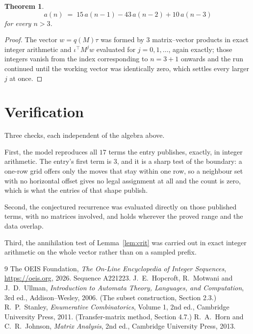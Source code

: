 \documentclass[11pt,a4paper]{article}
\theoremstyle{plain}
\newtheorem{theorem}{Theorem}
\theoremstyle{definition}
\begin{document}
\begin{theorem}
\[
a(n)\;=\;15\,a(n-1) - 43\,a(n-2) + 10\,a(n-3)
\]
for every $n>3$.
\end{theorem}

\begin{proof}
The vector $w=q(M)\tau$ was formed by $3$ matrix--vector products in exact integer
arithmetic and $\iota^{\!\top}M^{j}w$ evaluated for $j=0,1,\dots$, again exactly; those
integers vanish from the index corresponding to $n=3+1$ onwards and the run continued
until the working vector was identically zero, which settles every larger $j$ at once.
\end{proof}

\section{Verification}

Three checks, each independent of the algebra above.

First, the model reproduces all $17$ terms the entry publishes, exactly, in integer
arithmetic. The entry's first term is $3$, and it is a sharp test of the boundary: a
one-row grid offers only the moves that stay within one row, so a neighbour set with no
horizontal offset gives no legal assignment at all and the count is zero, which is what the
entries of that shape publish.

Second, the conjectured recurrence was evaluated directly on those published terms, with no
matrices involved, and holds wherever the proved range and the data overlap.

Third, the annihilation test of Lemma~\ref{lem:crit} was carried out in exact integer
arithmetic on the whole vector rather than on a sampled prefix.

\begin{thebibliography}{9}
 The OEIS Foundation, \emph{The On-Line Encyclopedia of Integer
Sequences}, \url{https://oeis.org}, 2026. Sequence A221223.
 J.~E.~Hopcroft, R.~Motwani and J.~D.~Ullman, \emph{Introduction to Automata
Theory, Languages, and Computation}, 3rd ed., Addison--Wesley, 2006. (The subset
construction, Section 2.3.)
 R.~P.~Stanley, \emph{Enumerative Combinatorics}, Volume 1, 2nd ed.,
Cambridge University Press, 2011. (Transfer-matrix method, Section 4.7.)
 R.~A.~Horn and C.~R.~Johnson, \emph{Matrix Analysis}, 2nd ed., Cambridge
University Press, 2013.
\end{thebibliography}
\end{document}
